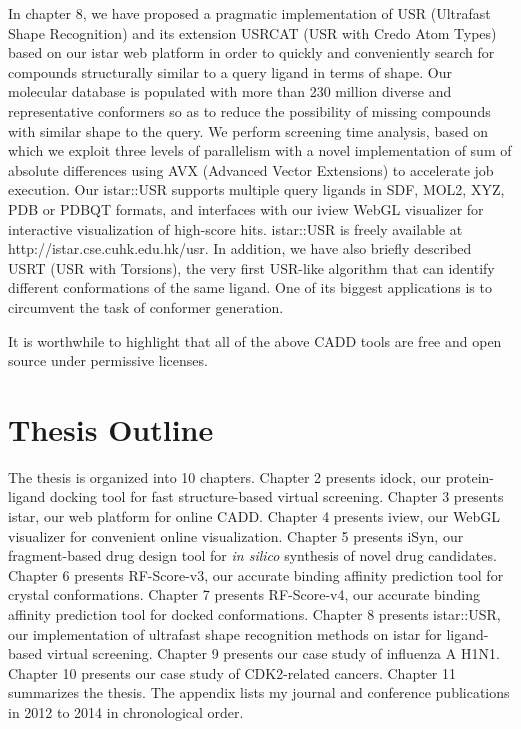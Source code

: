 In chapter 8, we have proposed a pragmatic implementation of USR (Ultrafast Shape Recognition) \citep{1379} and its extension USRCAT (USR with Credo Atom Types) \citep{1331} based on our istar web platform in order to quickly and conveniently search for compounds structurally similar to a query ligand in terms of shape. Our molecular database is populated with more than 230 million diverse and representative conformers so as to reduce the possibility of missing compounds with similar shape to the query. We perform screening time analysis, based on which we exploit three levels of parallelism with a novel implementation of sum of absolute differences using AVX (Advanced Vector Extensions) to accelerate job execution. Our istar::USR supports multiple query ligands in SDF, MOL2, XYZ, PDB or PDBQT formats, and interfaces with our iview WebGL visualizer for interactive visualization of high-score hits. istar::USR is freely available at http://istar.cse.cuhk.edu.hk/usr. In addition, we have also briefly described USRT (USR with Torsions), the very first USR-like algorithm that can identify different conformations of the same ligand. One of its biggest applications is to circumvent the task of conformer generation.

It is worthwhile to highlight that all of the above CADD tools are free and open source under permissive licenses.

\section{Thesis Outline}

The thesis is organized into 10 chapters. Chapter 2 presents idock, our protein-ligand docking tool for fast structure-based virtual screening. Chapter 3 presents istar, our web platform for online CADD. Chapter 4 presents iview, our WebGL visualizer for convenient online visualization. Chapter 5 presents iSyn, our fragment-based drug design tool for \textit{in silico} synthesis of novel drug candidates. Chapter 6 presents RF-Score-v3, our accurate binding affinity prediction tool for crystal conformations. Chapter 7 presents RF-Score-v4, our accurate binding affinity prediction tool for docked conformations. Chapter 8 presents istar::USR, our implementation of ultrafast shape recognition methods on istar for ligand-based virtual screening. Chapter 9 presents our case study of influenza A H1N1. Chapter 10 presents our case study of CDK2-related cancers. Chapter 11 summarizes the thesis. The appendix lists my journal and conference publications in 2012 to 2014 in chronological order.

\chapterend
